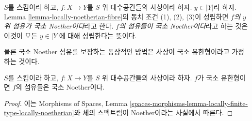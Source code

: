 \begin{definition}
\label{definition-locally-Noetherian-fibre}
$S$를 스킴이라 하고, $f : X \to Y$를 $S$ 위 대수공간들의 사상이라 하자.
$y \in |Y|$라 하자. Lemma \ref{lemma-locally-noetherian-fibre}의 동치 조건
(1), (2), (3)이 성립하면 {\it $f$의 $y$ 위 섬유가 국소 Noether이다}라고
한다. {\it $f$의 섬유들이 국소 Noether이다}라고 하는 것은 이것이
모든 $y \in |Y|$에 대해 성립한다는 뜻이다.
\end{definition}

\noindent
물론 국소 Noether 섬유를 보장하는 통상적인 방법은 사상이 국소 유한형이라고
가정하는 것이다.

\begin{lemma}
\label{lemma-locally-finite-type-locally-Noetherian-fibres}
$S$를 스킴이라 하고, $f : X \to Y$를 $S$ 위 대수공간들의 사상이라 하자.
$f$가 국소 유한형이면 $f$의 섬유들은 국소 Noether이다.
\end{lemma}

\begin{proof}
이는 Morphisms of Spaces, Lemma
\ref{spaces-morphisms-lemma-locally-finite-type-locally-noetherian}와
체의 스펙트럼이 Noether이라는 사실에서 따른다.
\end{proof}

